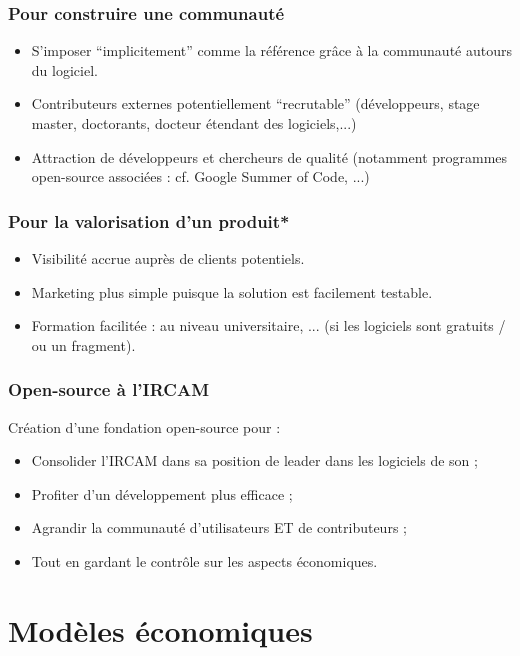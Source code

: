 \documentclass[xcolor=dvipsnames]{beamer}
\begin{document}
\begin{frame}
\frametitle{Pour construire une communauté}
\begin{itemize}
\item S'imposer ``implicitement'' comme la référence grâce à la communauté autours du logiciel.
\item Contributeurs externes potentiellement ``recrutable'' (développeurs, stage master, doctorants, docteur étendant des logiciels,...)
\item Attraction de développeurs et chercheurs de qualité (notamment programmes open-source associées : cf. Google Summer of Code, ...)
\end{itemize}
\end{frame}

\begin{frame}
\frametitle{Pour la valorisation d'un produit*}
\begin{itemize}
\item Visibilité accrue auprès de clients potentiels.
\item Marketing plus simple puisque la solution est facilement testable.
\item Formation facilitée : au niveau universitaire, ... (si les logiciels sont gratuits / ou un fragment).
\end{itemize}
\end{frame}

\begin{frame}
\frametitle{Open-source à l'IRCAM}
Création d'une fondation open-source pour :
\begin{itemize}
\item Consolider l'IRCAM dans sa position de leader dans les logiciels de son ;
\item Profiter d'un développement plus efficace ;
\item Agrandir la communauté d'utilisateurs ET de contributeurs ;
\item Tout en gardant le contrôle sur les aspects économiques.
\end{itemize}
\end{frame}

\section{Modèles économiques}
\end{document}
